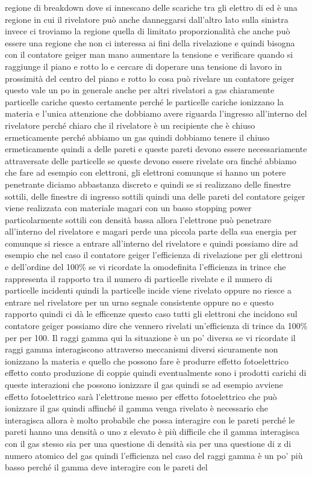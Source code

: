 regione di breakdown dove si innescano delle scariche tra gli elettro di ed è una regione in cui il rivelatore può anche danneggarsi dall'altro lato sulla sinistra invece ci troviamo la regione quella di limitato proporzionalità che anche può essere una regione che non ci interessa ai fini della rivelazione e quindi bisogna con il contatore geiger man mano aumentare la tensione e verificare quando si raggiunge il piano e rotto lo e cercare di doperare una tensione di lavoro in prossimità del centro del piano e rotto lo cosa può rivelare un contatore geiger questo vale un po in generale anche per altri rivelatori a gas chiaramente particelle cariche questo certamente perché le particelle cariche ionizzano la materia e l'unica attenzione che dobbiamo avere riguarda l'ingresso all'interno del rivelatore perché chiaro che il rivelatore è un recipiente che è chiuso ermeticamente perché abbiamo un gas quindi dobbiamo tenere il chiuso ermeticamente quindi a delle pareti e queste pareti devono essere necessariamente attraversate delle particelle se queste devono essere rivelate ora finché abbiamo che fare ad esempio con elettroni, gli elettroni comunque si hanno un potere penetrante diciamo abbastanza discreto e quindi se si realizzano delle finestre sottili, delle finestre di ingresso sottili quindi una delle pareti del contatore geiger viene realizzata con materiale magari con un basso stopping power particolarmente sottili con densità bassa allora l'elettrone può penetrare all'interno del rivelatore e magari perde una piccola parte della sua energia per comunque si riesce a entrare all'interno del rivelatore e quindi possiamo dire ad esempio che nel caso il contatore geiger l'efficienza di rivelazione per gli elettroni e dell'ordine del 100\% se vi ricordate la omodefinita l'efficienza in trince che rappresenta il rapporto tra il numero di particelle rivelate e il numero di particelle incidenti quindi la particelle incide viene rivelato oppure no riesce a entrare nel rivelatore per un urno segnale consistente oppure no e questo rapporto quindi ci dà le efficenze questo caso tutti gli elettroni che incidono sul contatore geiger possiamo dire che vennero rivelati un'efficienza di trince da 100\% per per 100. Il raggi gamma qui la situazione è un po' diversa se vi ricordate il raggi gamma interagiscono attraverso meccanismi diversi sicuramente non ionizzano la materia e quello che possono fare è produrre effetto fotoelettrico effetto conto produzione di coppie quindi eventualmente sono i prodotti carichi di queste interazioni che possono ionizzare il gas quindi se ad esempio avviene effetto fotoelettrico sarà l'elettrone messo per effetto fotoelettrico che può ionizzare il gas quindi affinché il gamma venga rivelato è necessario che interagisca allora è molto probabile che possa interagire con le pareti perché le pareti hanno una densità o uno z elevato è più difficile che il gamma interagisca con il gas stesso sia per una questione di densità sia per una questione di z di numero atomico del gas quindi l'efficienza nel caso del raggi gamma è un po' più basso perché il gamma deve interagire con le pareti del 

